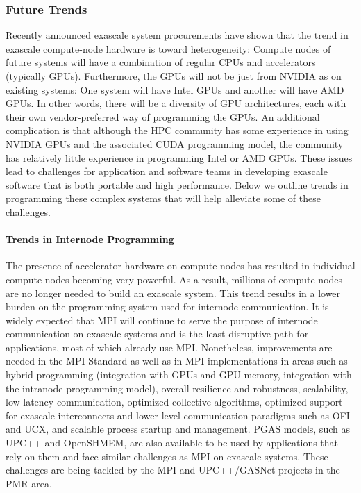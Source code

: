 \subsubsection{Future Trends}
Recently announced exascale system procurements have shown that the
trend in exascale compute-node hardware is toward heterogeneity:
Compute nodes of future systems will have a combination of regular
CPUs and accelerators (typically GPUs). Furthermore, the GPUs will not
be just from NVIDIA as on existing systems: One system will have Intel
GPUs and another will have AMD GPUs. In other words, there will be a
diversity of GPU architectures, each with their own vendor-preferred
way of programming the GPUs. An additional complication
is that although the HPC community has some experience in using NVIDIA
GPUs and the associated CUDA programming model, the community has relatively
little experience in programming Intel or AMD GPUs.  These
issues lead to challenges for application and software teams in
developing exascale software that is both portable and high performance. Below
we outline trends in programming these complex systems that will help
alleviate some of these challenges.

\paragraph{Trends in Internode Programming}
The presence of accelerator hardware on compute nodes has resulted in individual
compute nodes becoming very powerful. As a result, millions of compute
nodes are no longer needed to build an exascale system. This trend
results in a lower burden on the programming system used for internode
communication. It is widely expected that MPI will continue to serve
the purpose of internode communication on exascale systems and is the
least disruptive path for applications, most of which already use
MPI. Nonetheless, improvements are needed in the MPI Standard as well
as in MPI implementations in areas such as hybrid programming
(integration with GPUs and GPU memory, integration with the intranode
programming model), overall resilience and robustness, scalability,
low-latency communication, optimized collective algorithms, optimized support
for exascale interconnects and lower-level communication paradigms
such as OFI and UCX, and scalable process startup and management. PGAS
models, such as UPC++ and OpenSHMEM, are also available to be used by
applications that rely on them and face similar
challenges as MPI on exascale systems. These challenges are being tackled by the MPI and
UPC++/GASNet projects in the PMR area.

